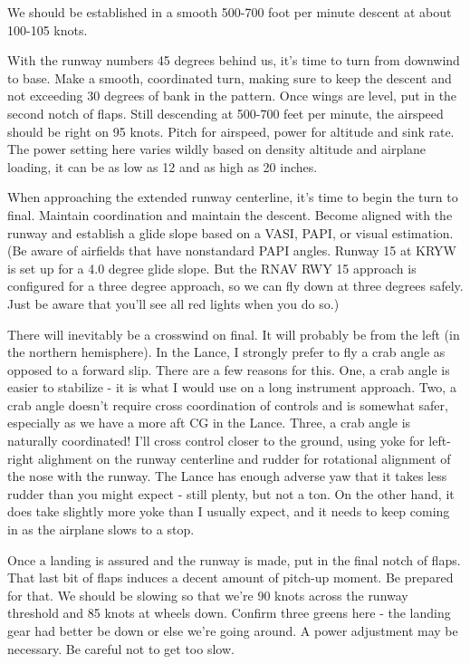 We should be established in a smooth 500-700 foot per minute descent at about 100-105 knots.

With the runway numbers 45 degrees behind us, it's time to turn from downwind to base. Make a smooth, coordinated turn, making sure to keep the descent and not exceeding 30 degrees of bank in the pattern. Once wings are level, put in the second notch of flaps. Still descending at 500-700 feet per minute, the airspeed should be right on 95 knots. Pitch for airspeed, power for altitude and sink rate. The power setting here varies wildly based on density altitude and airplane loading, it can be as low as 12 and as high as 20 inches.

When approaching the extended runway centerline, it's time to begin the turn to final. Maintain coordination and maintain the descent. Become aligned with the runway and establish a glide slope based on a VASI, PAPI, or visual estimation. (Be aware of airfields that have nonstandard PAPI angles. Runway 15 at KRYW is set up for a 4.0 degree glide slope. But the RNAV RWY 15 approach is configured for a three degree approach, so we can fly down at three degrees safely. Just be aware that you'll see all red lights when you do so.)

There will inevitably be a crosswind on final. It will probably be from the left (in the northern hemisphere). In the Lance, I strongly prefer to fly a crab angle as opposed to a forward slip. There are a few reasons for this. One, a crab angle is easier to stabilize - it is what I would use on a long instrument approach. Two, a crab angle doesn't require cross coordination of controls and is somewhat safer, especially as we have a more aft CG in the Lance. Three, a crab angle is naturally coordinated! I'll cross control closer to the ground, using yoke for left-right alighment on the runway centerline and rudder for rotational alignment of the nose with the runway. The Lance has enough adverse yaw that it takes less rudder than you might expect - still plenty, but not a ton. On the other hand, it does take slightly more yoke than I usually expect, and it needs to keep coming in as the airplane slows to a stop.

Once a landing is assured and the runway is made, put in the final notch of flaps. That last bit of flaps induces a decent amount of pitch-up moment. Be prepared for that. We should be slowing so that we're 90 knots across the runway threshold and 85 knots at wheels down. Confirm three greens here - the landing gear had better be down or else we're going around. A power adjustment may be necessary. Be careful not to get too slow.

